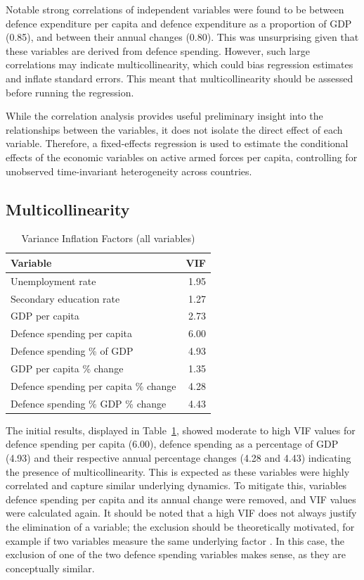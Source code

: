 Notable strong correlations of independent variables were found to be between defence expenditure per capita and 
defence expenditure as a proportion of GDP (0.85), and between their annual changes (0.80). 
This was unsurprising given that these variables are derived from defence spending. 
However, such large correlations may indicate multicollinearity, which could 
bias regression estimates and inflate standard errors. This meant that multicollinearity should be 
assessed before running the regression.

While the correlation analysis provides useful preliminary insight into the relationships between 
the variables, it does not isolate the direct effect of each variable. Therefore, a 
fixed-effects regression is used to estimate the conditional effects of the economic variables 
on active armed forces per capita, controlling for unobserved time-invariant heterogeneity 
across countries.

\subsection{Multicollinearity}

\begin{table}[ht]
\caption{Variance Inflation Factors (all variables)}
\small
\centering
\begin{tabularx}{\textwidth}{l r}
\toprule
\textbf{Variable} & \textbf{VIF} \\
\midrule
Unemployment rate & 1.95 \\
Secondary education rate & 1.27 \\
GDP per capita & 2.73 \\
Defence spending per capita & 6.00 \\
Defence spending \% of GDP & 4.93 \\
GDP per capita \% change & 1.35 \\
Defence spending per capita \% change & 4.28 \\
Defence spending \% GDP \% change & 4.43 \\
\bottomrule
\end{tabularx}
\label{tab:multicollinearity_full}
\end{table}

The initial results, displayed in Table~\ref{tab:multicollinearity_full}, showed moderate to high VIF values for defence spending per capita (6.00), 
defence spending as a percentage of GDP (4.93) and their respective annual percentage changes (4.28 and 4.43)
indicating the presence of multicollinearity. This is expected as these variables were highly correlated 
and capture similar underlying dynamics.
To mitigate 
this, variables defence spending per capita and its annual change were removed, and VIF values 
were calculated again.
It should be noted that a high VIF does not always justify the elimination of a variable;  
the exclusion should be theoretically motivated, for example if two variables measure 
the same underlying factor \parencite{obrien_caution_2007}. In this case, the 
exclusion of one of the two defence spending variables makes sense, as they are conceptually similar.

